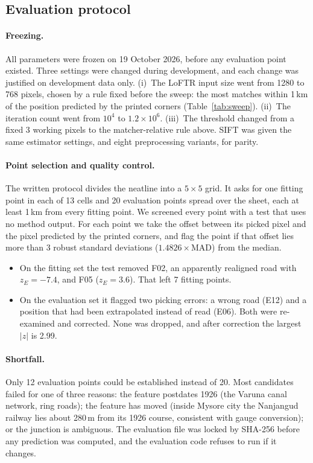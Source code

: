 \documentclass[10pt,twocolumn]{article}
\newcommand{\metre}{\,m}
\begin{document}
\subsection{Evaluation protocol}
\paragraph{Freezing.} All parameters were frozen on 19 October 2026, before any evaluation point existed. Three settings were changed during development, and each change was justified on development data only. (i)~The LoFTR input size went from 1280 to 768 pixels, chosen by a rule fixed before the sweep: the most matches within 1\,km of the position predicted by the printed corners (Table~\ref{tab:sweep}). (ii)~The iteration count went from $10^4$ to $1.2\times10^6$. (iii)~The threshold changed from a fixed 3 working pixels to the matcher-relative rule above. SIFT was given the same estimator settings, and eight preprocessing variants, for parity.

\paragraph{Point selection and quality control.}\label{sec:gcp}
The written protocol divides the neatline into a $5\times5$ grid. It asks for one fitting point in each of 13 cells and 20 evaluation points spread over the sheet, each at least 1\,km from every fitting point. We screened every point with a test that uses no method output. For each point we take the offset between its picked pixel and the pixel predicted by the printed corners, and flag the point if that offset lies more than 3 robust standard deviations ($1.4826\times$MAD) from the median.
\begin{itemize}
\item On the fitting set the test removed F02, an apparently realigned road with $z_E=-7.4$, and F05 ($z_E=3.6$). That left 7 fitting points.
\item On the evaluation set it flagged two picking errors: a wrong road (E12) and a position that had been extrapolated instead of read (E06). Both were re-examined and corrected. None was dropped, and after correction the largest $|z|$ is 2.99.
\end{itemize}

\paragraph{Shortfall.} Only 12 evaluation points could be established instead of 20. Most candidates failed for one of three reasons: the feature postdates 1926 (the Varuna canal network, ring roads); the feature has moved (inside Mysore city the Nanjangud railway lies about 280\metre{} from its 1926 course, consistent with gauge conversion); or the junction is ambiguous. The evaluation file was locked by SHA-256 before any prediction was computed, and the evaluation code refuses to run if it changes.
\end{document}
